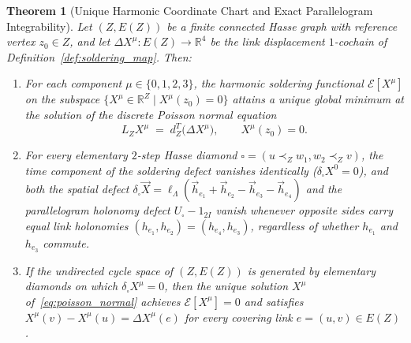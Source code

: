 \documentclass[11pt,a4paper]{article}
\newtheorem{theorem}{Theorem}[section]
\theoremstyle{definition}
\theoremstyle{remark}
\newcommand{\R}{\mathbb{R}}
\begin{document}
\begin{theorem}[Unique Harmonic Coordinate Chart and Exact Parallelogram Integrability]
\label{thm:harmonic_chart}
Let $(Z, E(Z))$ be a finite connected Hasse graph with reference vertex $z_0 \in Z$, and let $\Delta X^\mu : E(Z) \to \R^4$ be the link displacement $1$-cochain of Definition~\ref{def:soldering_map}. Then:
\begin{enumerate}
    \item For each component $\mu \in \{0, 1, 2, 3\}$, the harmonic soldering functional $\mathcal{E}[X^\mu]$ on the subspace $\{X^\mu \in \R^Z \mid X^\mu(z_0) = 0\}$ attains a unique global minimum at the solution of the discrete Poisson normal equation
    \begin{equation}
    \label{eq:poisson_normal}
    L_Z X^\mu \;=\; d_Z^T\bigl(\Delta X^\mu\bigr), \qquad X^\mu(z_0) = 0.
    \end{equation}
    \item For every elementary $2$-step Hasse diamond $\square = (u \prec_Z w_1, w_2 \prec_Z v)$, the time component of the soldering defect vanishes identically ($\delta_\square X^0 = 0$), and both the spatial defect $\delta_\square \vec{X} = \ell_\Lambda(\vec{h}_{e_1} + \vec{h}_{e_2} - \vec{h}_{e_3} - \vec{h}_{e_4})$ and the parallelogram holonomy defect $U_\square - 1_{2I}$ vanish whenever opposite sides carry equal link holonomies $(h_{e_1}, h_{e_2}) = (h_{e_4}, h_{e_3})$, regardless of whether $h_{e_1}$ and $h_{e_3}$ commute.
    \item If the undirected cycle space of $(Z, E(Z))$ is generated by elementary diamonds on which $\delta_\square X^\mu = 0$, then the unique solution $X^\mu$ of~\eqref{eq:poisson_normal} achieves $\mathcal{E}[X^\mu] = 0$ and satisfies $X^\mu(v) - X^\mu(u) = \Delta X^\mu(e)$ for every covering link $e = (u, v) \in E(Z)$.
\end{enumerate}
\end{theorem}
\end{document}
